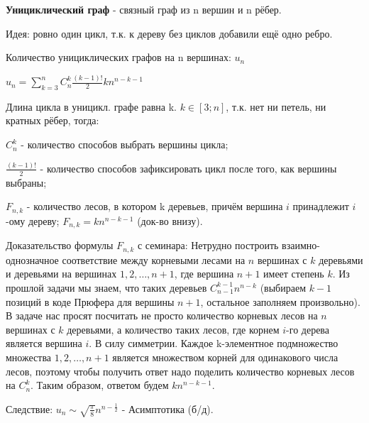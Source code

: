 \textbf{Унициклический граф} - связный граф из n вершин и n рёбер.

Идея: ровно один цикл, т.к. к дереву без циклов добавили ещё одно ребро.

Количество унициклических графов на n вершинах: $u_n$

\Th $u_n = \sum_{k=3}^n C_n^k \frac{(k-1)!}{2} kn^{n-k-1}$

\Proof
Длина цикла в уницикл. графе равна k. $k \in [3; n]$, т.к. нет ни петель, ни кратных рёбер, тогда: 

$C_n^k$ - количество способов выбрать вершины цикла; 

$\frac{(k-1)!}{2}$ - количество способов зафиксировать цикл после того, как вершины выбраны;  

$F_{n, k}$ - количество лесов, в котором k деревьев, причём вершина $i$ принадлежит $i$-ому дереву; $F_{n, k} = kn^{n-k-1}$ (док-во внизу).
\EndProof

\leftbar

Доказательство формулы $F_{n, k}$ с семинара: Нетрудно построить взаимно-однозначное соответствие между корневыми лесами на $n$ вершинах с $k$ деревьями и деревьями на вершинах ${1, 2, \dots, n+1}$, где вершина $n+1$ имеет степень $k$. Из прошлой задачи мы знаем, что таких деревьев $C_{n-1}^{k-1}n^{n-k}$ (выбираем $k-1$ позиций в коде Прюфера для вершины $n+1$, остальное заполняем произвольно). В задаче нас просят посчитать не просто количество корневых лесов на $n$ вершинах с $k$ деревьями, а количество таких лесов, где корнем $i$-го дерева является вершина $i$. В силу симметрии. Каждое k-элементное подмножество множества ${1, 2, \dots, n+1}$ является множеством корней для одинакового числа лесов, поэтому чтобы получить ответ надо поделить количество корневых лесов на $C_n^k$. Таким образом, ответом будем $kn^{n-k-1}$.
\endleftbar

Следствие: $u_n \sim \sqrt{\frac{\pi}{8}} n^{n - \frac{1}{2}}$ - Асимптотика (б/д).
